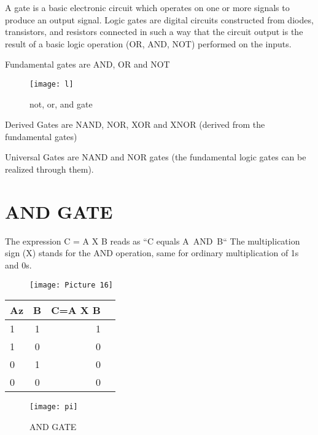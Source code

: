 \documentclass{article}
\begin{document}
A gate is a basic electronic circuit which operates on one or more signals to produce an output signal. 
Logic gates are digital circuits constructed from diodes, transistors, and resistors connected in such a way that the circuit output is the result of a basic logic operation (OR, AND, NOT) performed on the inputs.

	Fundamental gates are AND, OR and NOT
	
	\begin{figure}[h!]
	\texttt{[image: l]}
	\caption{not, or, and gate}
\end{figure}

Derived Gates are NAND, NOR, XOR and XNOR (derived from the fundamental gates)


Universal Gates are NAND and NOR gates (the fundamental logic gates can be realized through them).

\section{AND GATE}
The expression C = A X B reads as “C equals A AND B“ 
The multiplication sign (X) stands for the AND operation, same for ordinary multiplication of 1s and 0s.

	\begin{figure}[h!]
	\texttt{[image: Picture 16]}
	
\end{figure}

\begin{table}[h!]
	\begin{center}
	\begin{tabular}{|l|c|r|c}
\cellcolor{blue!35}\textbf{Az} & \cellcolor{blue!35}\textbf{B} & \cellcolor{blue!35}\textbf{C=A X B}\\
		\hline
\cellcolor{blue!15}	1 & \cellcolor{blue!15}1 & \cellcolor{blue!15}1\\
\cellcolor{blue!15}	1 & \cellcolor{blue!15} 0 & \cellcolor{blue!15}0\\
\cellcolor{blue!15}	0 & \cellcolor{blue!15}1 & \cellcolor{blue!15} 0\\
\cellcolor{blue!15}	0 & \cellcolor{blue!15}0 & \cellcolor{blue!15}0\\
	\hline	
\end{tabular}
	\end{center}
\end{table}

\begin{figure}[h!]
\texttt{[image: pi]}
\caption{AND GATE}

\end{figure}
\end{document}
